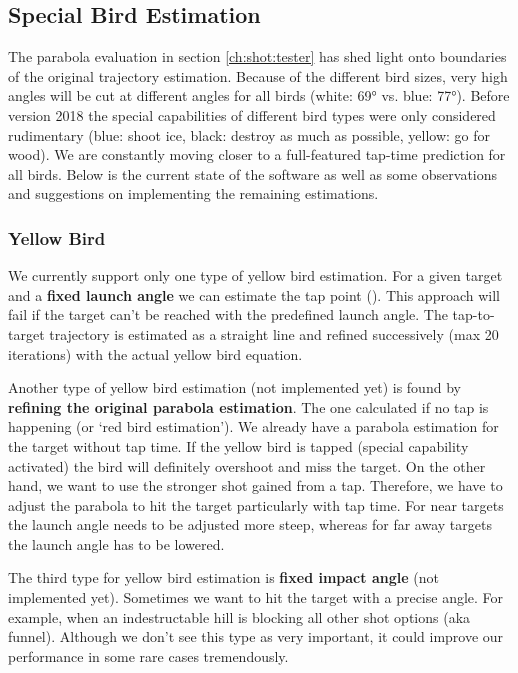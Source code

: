 \subsection{Special Bird Estimation}

The parabola evaluation in section \ref{ch:shot:tester} has shed light onto boundaries of the original trajectory estimation. Because of the different bird sizes, very high angles will be cut at different angles for all birds (white: \ang{69} vs. blue: \ang{77}). Before version 2018 the special capabilities of different bird types were only considered rudimentary (blue: shoot ice, black: destroy as much as possible, yellow: go for wood). We are constantly moving closer to a full-featured tap-time prediction for all birds. Below is the current state of the software as well as some observations and suggestions on implementing the remaining estimations.


\subsubsection{Yellow Bird}\label{ch:shot:yellowbird}

We currently support only one type of yellow bird estimation. For a given target and a \textbf{fixed launch angle} we can estimate the tap point (). This approach will fail if the target can't be reached with the predefined launch angle. The tap-to-target trajectory is estimated as a straight line and refined successively (max \num{20} iterations) with the actual yellow bird equation.

Another type of yellow bird estimation (not implemented yet) is found by \textbf{refining the original parabola estimation}. The one calculated if no tap is happening (or `red bird estimation'). We already have a parabola estimation for the target without tap time. If the yellow bird is tapped (special capability activated) the bird will definitely overshoot and miss the target. On the other hand, we want to use the stronger shot gained from a tap. Therefore, we have to adjust the parabola to hit the target particularly with tap time. For near targets the launch angle needs to be adjusted more steep, whereas for far away targets the launch angle has to be lowered.

The third type for yellow bird estimation is \textbf{fixed impact angle} (not implemented yet). Sometimes we want to hit the target with a precise angle. For example, when an indestructable hill is blocking all other shot options (aka funnel). Although we don't see this type as very important, it could improve our performance in some rare cases tremendously.


